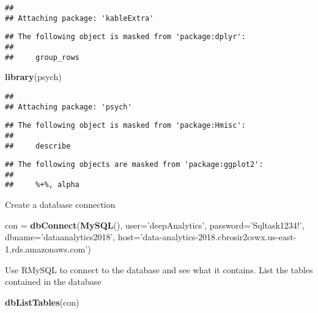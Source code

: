 \documentclass[]{article}
\newenvironment{Shaded}{\begin{snugshade}}{\end{snugshade}}
\newcommand{\DataTypeTok}[1]{\textcolor[rgb]{0.13,0.29,0.53}{#1}}
\newcommand{\KeywordTok}[1]{\textcolor[rgb]{0.13,0.29,0.53}{\textbf{#1}}}
\newcommand{\NormalTok}[1]{#1}
\newcommand{\StringTok}[1]{\textcolor[rgb]{0.31,0.60,0.02}{#1}}
\begin{document}
\begin{verbatim}
## 
## Attaching package: 'kableExtra'
\end{verbatim}

\begin{verbatim}
## The following object is masked from 'package:dplyr':
## 
##     group_rows
\end{verbatim}

\begin{Shaded}
\begin{Highlighting}[]
\KeywordTok{library}\NormalTok{(psych)}
\end{Highlighting}
\end{Shaded}

\begin{verbatim}
## 
## Attaching package: 'psych'
\end{verbatim}

\begin{verbatim}
## The following object is masked from 'package:Hmisc':
## 
##     describe
\end{verbatim}

\begin{verbatim}
## The following objects are masked from 'package:ggplot2':
## 
##     %+%, alpha
\end{verbatim}

Create a database connection

\begin{Shaded}
\begin{Highlighting}[]
\NormalTok{ con =}\StringTok{ }\KeywordTok{dbConnect}\NormalTok{(}\KeywordTok{MySQL}\NormalTok{(), }\DataTypeTok{user=}\StringTok{'deepAnalytics'}\NormalTok{, }\DataTypeTok{password=}\StringTok{'Sqltask1234!'}\NormalTok{, }
                 \DataTypeTok{dbname=}\StringTok{'dataanalytics2018'}\NormalTok{, }\DataTypeTok{host=}\StringTok{'data-analytics-2018.cbrosir2cswx.us-east-1.rds.amazonaws.com'}\NormalTok{)}
\end{Highlighting}
\end{Shaded}

Use RMySQL to connect to the database and see what it contains. List the
tables contained in the database

\begin{Shaded}
\begin{Highlighting}[]
\KeywordTok{dbListTables}\NormalTok{(con)}
\end{Highlighting}
\end{Shaded}
\end{document}

